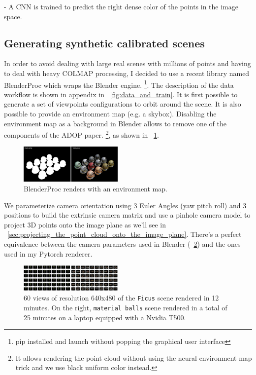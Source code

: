 \noindent -  A CNN is trained to predict the right dense color of the points in the image space.


\subsection{Generating synthetic calibrated scenes}
\label{sec:synthetic_calibrated_scenes}
In order to avoid dealing with large real scenes with millions of points and having to deal with heavy COLMAP processing, I decided to use a recent library named BlenderProc  \cite{Denninger2023} which wraps the Blender engine. \footnote{pip installed and launch without popping the graphical user interface}.
The description of the data workflow is shown in appendix in ~\cref{fig:data_and_train}. It is first possible to generate a set of viewpoints configurations to orbit around the scene. It is also possible to provide an environment map (e.g. a skybox). 
Disabling the environment map as a background in Blender allows to remove one of the components of the ADOP paper. \footnote{It allows rendering the point cloud without using the neural environment map trick and we use black uniform color instead.}, as shown in ~\cref{fig:blenderproc_renders}. 

\begin{figure}[htpb]
    \centering
    \includegraphics[width=0.45\textwidth]{figures/blenderproc_renders.png}
    \caption{BlenderProc renders with an environment map.}
    \label{fig:blenderproc_renders}
\end{figure}

\noindent We parameterize camera orientation using 3 Euler Angles (yaw pitch roll) and 3 positions to build the extrinsic camera matrix and use a pinhole camera model to project 3D points onto the image plane as we'll see in ~\cref{sec:projecting_the_point_cloud_onto_the_image_plane}. There's a perfect equivalence between the camera parameters used in Blender (~\cref{fig:multiview}) and the ones used in my Pytorch renderer.
\begin{figure}[H]
    \centering
    \includegraphics[width=0.45\textwidth]{figures/ficus_and_matballs.png}
    \caption{60 views of resolution 640x480 of the \texttt{Ficus} scene rendered in 12 minutes. On the right, \texttt{material balls} scene rendered in a total of 25 minutes on a laptop equipped with a Nvidia T500.}
    \label{fig:multiview}
\end{figure}

